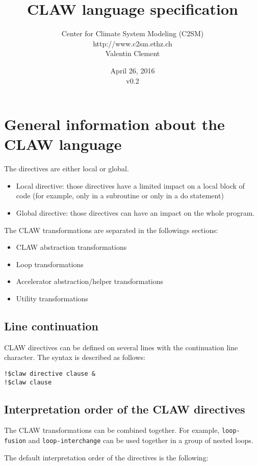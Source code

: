 \documentclass{article}
\title{CLAW language specification}
\author{Center for Climate System Modeling (C2SM)\\http://www.c2sm.ethz.ch\\Valentin Clement}
\date{April 26, 2016\\\vspace{1em}v0.2}
\begin{document}
\maketitle


\tableofcontents

\section{General information about the CLAW language}
The directives are either local or global.

\begin{itemize}
\item Local directive: those directives have a limited impact on a local block of
code (for example, only in a subroutine or only in a do statement)
\item Global directive: those directives can have an impact on the whole
program.
\end{itemize}

The CLAW transformations are separated in the followings sections:
\begin{itemize}
\item CLAW abstraction transformations
\item Loop transformations
\item Accelerator abstraction/helper transformations
\item Utility transformations
\end{itemize}

\subsection{Line continuation}
CLAW directives can be defined on several lines with the continuation line character. The syntax is described as follows:

\begin{lstlisting}
!$claw directive clause &
!$claw clause
\end{lstlisting}


\subsection{Interpretation order of the CLAW directives}
The CLAW transformations can be combined together. For example, \lstinline!loop-fusion! and \lstinline!loop-interchange! can be used together in a group of nested loops.

The default interpretation order of the directives is the following:
\end{document}
